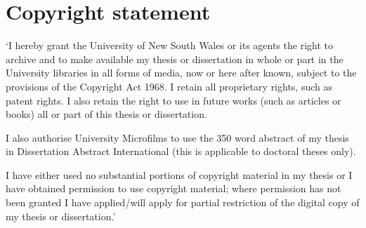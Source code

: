 \chapter*{Copyright statement}
`I hereby grant the University of New South Wales or its agents the right to archive and to make available my thesis or dissertation in whole or part in the University libraries in all forms of media, now or here after known, subject to the provisions of the Copyright Act 1968. I retain all proprietary rights, such as patent rights. I also retain the right to use in future works (such as articles or books) all or part of this thesis or dissertation.

I also authorise University Microfilms to use the 350 word abstract of my thesis in Dissertation Abstract International (this is applicable to doctoral theses only).

I have either used no substantial portions of copyright material in my thesis or I have obtained permission to use copyright material; where permission has not been granted I have applied/will apply for partial restriction of the digital copy of my thesis or dissertation.'
